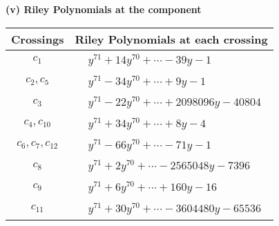 \documentclass[1p]{elsarticle_modified}
\theoremstyle{definition}
\begin{document}
\newpage\renewcommand{\arraystretch}{1}
\flushleft \textbf{(v) Riley Polynomials at the component}\newline \\
\begin{tabular}{m{50pt}|m{274pt}}
Crossings & \hspace{64pt}Riley Polynomials at each crossing \\
\hline $$\begin{aligned}c_{1}\end{aligned}$$&$\begin{aligned}
&y^{71}+14 y^{70}+\cdots-39 y-1
\end{aligned}$\\
\hline $$\begin{aligned}c_{2},c_{5}\end{aligned}$$&$\begin{aligned}
&y^{71}-34 y^{70}+\cdots+9 y-1
\end{aligned}$\\
\hline $$\begin{aligned}c_{3}\end{aligned}$$&$\begin{aligned}
&y^{71}-22 y^{70}+\cdots+2098096 y-40804
\end{aligned}$\\
\hline $$\begin{aligned}c_{4},c_{10}\end{aligned}$$&$\begin{aligned}
&y^{71}+34 y^{70}+\cdots+8 y-4
\end{aligned}$\\
\hline $$\begin{aligned}c_{6},c_{7},c_{12}\end{aligned}$$&$\begin{aligned}
&y^{71}-66 y^{70}+\cdots-71 y-1
\end{aligned}$\\
\hline $$\begin{aligned}c_{8}\end{aligned}$$&$\begin{aligned}
&y^{71}+2 y^{70}+\cdots-2565048 y-7396
\end{aligned}$\\
\hline $$\begin{aligned}c_{9}\end{aligned}$$&$\begin{aligned}
&y^{71}+6 y^{70}+\cdots+160 y-16
\end{aligned}$\\
\hline $$\begin{aligned}c_{11}\end{aligned}$$&$\begin{aligned}
&y^{71}+30 y^{70}+\cdots-3604480 y-65536
\end{aligned}$\\
\hline
\end{tabular}\\~\\
\end{document}
